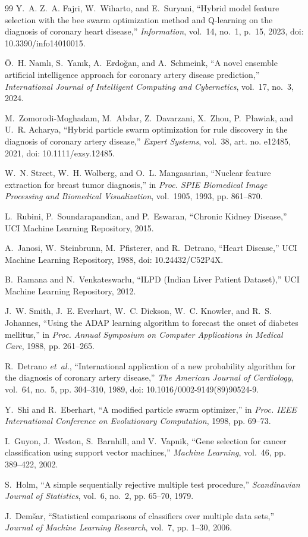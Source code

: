 \documentclass[conference]{IEEEtran}
\begin{document}
\begin{thebibliography}{99}
Y.~A. Z.~A. Fajri, W.~Wiharto, and E.~Suryani, ``Hybrid model feature
selection with the bee swarm optimization method and Q-learning on the
diagnosis of coronary heart disease,'' \emph{Information}, vol.~14, no.~1,
p.~15, 2023, doi: 10.3390/info14010015.

{\"O}.~H. Naml{\i}, S.~Yan{\i}k, A.~Erdo{\u{g}}an, and A.~Schmeink, ``A novel
ensemble artificial intelligence approach for coronary artery disease
prediction,'' \emph{International Journal of Intelligent Computing and
Cybernetics}, vol.~17, no.~3, 2024.

M.~Zomorodi-Moghadam, M.~Abdar, Z.~Davarzani, X.~Zhou, P.~P{\l}awiak, and
U.~R. Acharya, ``Hybrid particle swarm optimization for rule discovery in the
diagnosis of coronary artery disease,'' \emph{Expert Systems}, vol.~38,
art. no. e12485, 2021, doi: 10.1111/exsy.12485.

W.~N. Street, W.~H. Wolberg, and O.~L. Mangasarian, ``Nuclear feature
extraction for breast tumor diagnosis,'' in \emph{Proc. SPIE Biomedical Image
Processing and Biomedical Visualization}, vol.~1905, 1993, pp. 861--870.

L.~Rubini, P.~Soundarapandian, and P.~Eswaran, ``Chronic Kidney Disease,''
UCI Machine Learning Repository, 2015.

A.~Janosi, W.~Steinbrunn, M.~Pfisterer, and R.~Detrano, ``Heart Disease,''
UCI Machine Learning Repository, 1988, doi: 10.24432/C52P4X.

B.~Ramana and N.~Venkateswarlu, ``ILPD (Indian Liver Patient Dataset),''
UCI Machine Learning Repository, 2012.

J.~W. Smith, J.~E. Everhart, W.~C. Dickson, W.~C. Knowler, and R.~S.
Johannes, ``Using the ADAP learning algorithm to forecast the onset of
diabetes mellitus,'' in \emph{Proc. Annual Symposium on Computer Applications
in Medical Care}, 1988, pp. 261--265.

R.~Detrano \emph{et~al.}, ``International application of a new probability
algorithm for the diagnosis of coronary artery disease,'' \emph{The American
Journal of Cardiology}, vol.~64, no.~5, pp. 304--310, 1989, doi:
10.1016/0002-9149(89)90524-9.

Y.~Shi and R.~Eberhart, ``A modified particle swarm optimizer,'' in
\emph{Proc. IEEE International Conference on Evolutionary Computation}, 1998,
pp. 69--73.

I.~Guyon, J.~Weston, S.~Barnhill, and V.~Vapnik, ``Gene selection for cancer
classification using support vector machines,'' \emph{Machine Learning},
vol.~46, pp. 389--422, 2002.

S.~Holm, ``A simple sequentially rejective multiple test procedure,''
\emph{Scandinavian Journal of Statistics}, vol.~6, no.~2, pp. 65--70, 1979.

J.~Dem{\v{s}}ar, ``Statistical comparisons of classifiers over multiple data
sets,'' \emph{Journal of Machine Learning Research}, vol.~7, pp. 1--30, 2006.

\end{thebibliography}
\end{document}
